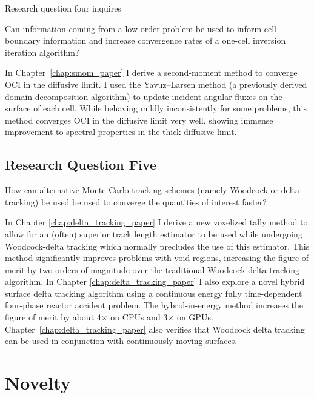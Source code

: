 Research question four inquires
\begin{displayquote}
Can information coming from a low-order problem be used to inform cell boundary information and increase convergence rates of a one-cell inversion iteration algorithm?
\end{displayquote}
In Chapter~\ref{chap:smom_paper} I derive a second-moment method to converge OCI in the diffusive limit.
I used the Yavuz--Larsen method (a previously derived domain decomposition algorithm) to update incident angular fluxes on the surface of each cell.
While behaving mildly inconsistently for some problems, this method converges OCI in the diffusive limit very well, showing immense improvement to spectral properties in the thick-diffusive limit.


\subsection{Research Question Five}

\begin{displayquote}
How can alternative Monte Carlo tracking schemes (namely Woodcock or delta tracking) be used be used to converge the quantities of interest faster?
\end{displayquote}
In Chapter \ref{chap:delta_tracking_paper} I derive a new voxelized tally method to allow for an (often) superior track length estimator to be used while undergoing Woodcock-delta tracking which normally precludes the use of this estimator.
This method significantly improves problems with void regions, increasing the figure of merit by two orders of magnitude over the traditional Woodcock-delta tracking algorithm.
In Chapter \ref{chap:delta_tracking_paper} I also explore a novel hybrid surface delta tracking algorithm using a continuous energy fully time-dependent four-phase reactor accident problem.
The hybrid-in-energy method increases the figure of merit by about 4$\times$ on CPUs and 3$\times$ on GPUs.
Chapter~\ref{chap:delta_tracking_paper} also verifies that Woodcock delta tracking can be used in conjunction with continuously moving surfaces.

\section{Novelty}

